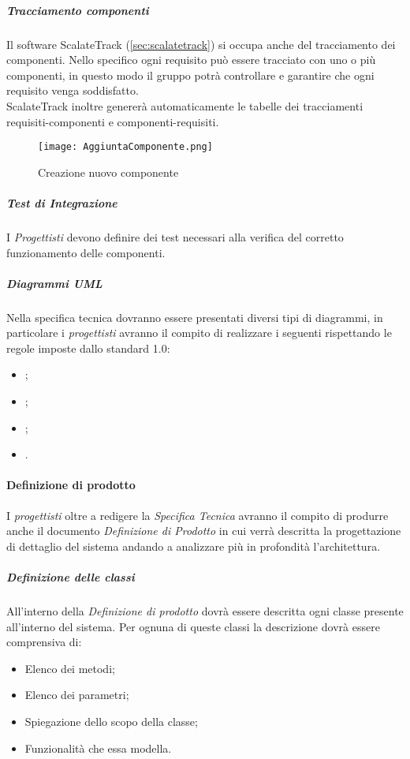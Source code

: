 \documentclass{scalatekids-article}
\begin{document}
\subparagraph{Tracciamento componenti}

Il software ScalateTrack (\ref{sec:scalatetrack}) si occupa anche del
tracciamento dei componenti. Nello specifico ogni requisito può essere tracciato
con uno o più componenti, in questo modo il gruppo potrà controllare e garantire
che ogni requisito venga soddisfatto.\\ ScalateTrack inoltre genererà
automaticamente le tabelle dei tracciamenti requisiti-componenti e
componenti-requisiti.

\begin{figure}[H]
  \centering
  \texttt{[image: AggiuntaComponente.png]}
  \caption{Creazione nuovo componente}
\end{figure}

\subparagraph{Test di Integrazione}

I \textit{Progettisti} devono definire dei test necessari alla verifica del
corretto funzionamento delle componenti.

\subparagraph{Diagrammi UML}
\label{sec:diagrammiUmlSpecTec}
Nella specifica tecnica dovranno essere presentati diversi tipi di diagrammi, in
particolare i \textit{progettisti} avranno il compito di realizzare i seguenti
rispettando le regole imposte dallo standard 
1.0:
\begin{itemize}
\item {};
\item {};
\item {};
\item {}.
\end{itemize}

\paragraph{Definizione di prodotto}
I \textit{progettisti} oltre a redigere la \textit{Specifica Tecnica} avranno il compito di
produrre anche il documento \textit{Definizione di Prodotto} in cui verrà descritta
la progettazione di dettaglio del sistema andando a analizzare più in profondità
l'architettura.

\subparagraph{Definizione delle classi}
All'interno della \textit{Definizione di prodotto} dovrà essere descritta ogni
classe presente all'interno del sistema. Per ognuna di queste classi la descrizione
dovrà essere comprensiva di:
\begin{itemize}
\item Elenco dei metodi;
\item Elenco dei parametri;
\item Spiegazione dello scopo della classe;
\item Funzionalità che essa modella.
\end{itemize}
\end{document}
